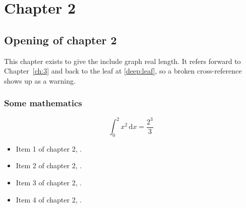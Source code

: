 \chapter{Chapter 2}
\label{ch:2}
\section{Opening of chapter 2}
This chapter exists to give the include graph real length. It refers
forward to Chapter~\ref{ch:3} and back to the leaf
at \ref{deep:leaf}, so a broken cross-reference shows up as a warning.

\subsection{Some mathematics}
\begin{equation}
  \int_0^{2} x^{2} \, \mathrm{d}x = \frac{2^{3}}{3}
\end{equation}

\begin{itemize}
  \item Item 1 of chapter 2, .
  \item Item 2 of chapter 2, .
  \item Item 3 of chapter 2, .
  \item Item 4 of chapter 2, .
\end{itemize}
